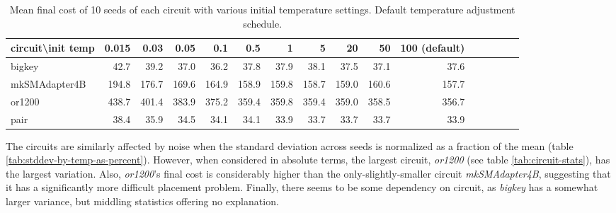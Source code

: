 \documentclass[11pt]{article}
\begin{document}
\begin{table}
\centering
\begin{tabular}{l | *{15}r}
\hline\hline
circuit\textbackslash init temp & 0.015 & 0.03 & 0.05 & 0.1 & 0.5 & 1 & 5 & 20 & 50 & 100 (default)\\
\hline
bigkey & 42.7 & 39.2 & 37.0 & 36.2 & 37.8 & 37.9 & 38.1 & 37.5 & 37.1 & 37.6 \\
mkSMAdapter4B & 194.8 & 176.7 & 169.6 & 164.9 & 158.9 & 159.8 & 158.7 & 159.0 & 160.6 & 157.7 \\
or1200 & 438.7 & 401.4 & 383.9 & 375.2 & 359.4 & 359.8 & 359.4 & 359.0 & 358.5 & 356.7 \\
pair & 38.4 & 35.9 & 34.5 & 34.1 & 34.1 & 33.9 & 33.7 & 33.7 & 33.7 & 33.9 \\
\hline\hline
\end{tabular}
\caption{Mean final cost of 10 seeds of each circuit with various initial temperature settings. Default temperature adjustment schedule. }
\label{tab:mean-by-temp}
\end{table}

The circuits are similarly affected by noise when the standard deviation across seeds is normalized as a fraction of the mean (table \ref{tab:stddev-by-temp-as-percent}). However, when considered in absolute terms, the largest circuit, \emph{or1200} (see table \ref{tab:circuit-stats}), has the largest variation. Also, \emph{or1200}'s final cost is considerably higher than the only-slightly-smaller circuit \emph{mkSMAdapter4B}, suggesting that it has a significantly more difficult placement problem. Finally, there seems to be some dependency on circuit, as \emph{bigkey} has a somewhat larger variance, but middling statistics offering no explanation.
\end{document}
